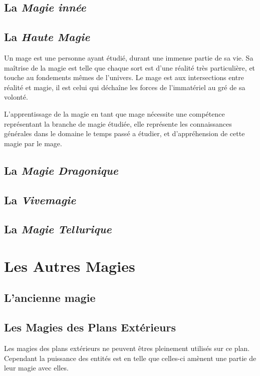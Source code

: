 \subsection{La {\em Magie innée}}
\subsection{La {\em Haute Magie}}
Un mage est une personne ayant étudié, durant une immense partie de sa vie. 
Sa maîtrise de la magie est telle que chaque sort est d’une réalité très particulière, 
et touche au fondements mêmes de l’univers. Le mage est aux intersections entre réalité et magie, 
il est celui qui déchaîne les forces de l'immatériel au gré de sa volonté.

L’apprentissage de la magie en tant que mage nécessite une compétence représentant la branche de magie étudiée, 
elle représente les connaissances générales dans le domaine le temps passé a étudier, et d'appréhension de cette magie par le mage.

\subsection{La {\em Magie Dragonique}}

\subsection{La {\em Vivemagie}}
\subsection{La {\em Magie Tellurique}}
\section{Les Autres Magies}
\subsection{L'ancienne magie}
\subsection{Les Magies des Plans Extérieurs}
Les magies des plans extérieurs ne peuvent êtres pleinement utilisés sur ce plan.
Cependant la puissance des entités est en telle que celles-ci amènent une partie de leur magie avec elles.
